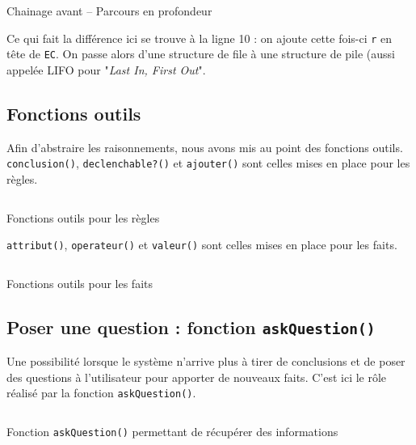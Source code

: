 \documentclass[a4paper,12pt]{article}
\begin{document}
\begin{listing}[H]
	\centering
	\inputminted[breaklines=true,linenos]{lisp}{../chainageAvantProf.lisp}
	\caption{Chainage avant -- Parcours en profondeur}
\end{listing}


Ce qui fait la différence ici se trouve à la ligne 10 : on ajoute cette fois-ci \texttt{r} en tête de \texttt{EC}. On passe alors d'une structure de file à une structure de pile (aussi appelée LIFO pour "\textit{Last In, First Out}".

\subsection{Fonctions outils}

Afin d'abstraire les raisonnements, nous avons mis au point des fonctions outils. \texttt{conclusion()}, \texttt{declenchable?()} et \texttt{ajouter()} sont celles mises en place pour les règles.
\begin{listing}[H]
	\centering
	\inputminted[breaklines=true,linenos]{lisp}{../fonctionsOutilsRegles.lisp}
	\caption{Fonctions outils pour les règles}
\end{listing}

\texttt{attribut()}, \texttt{operateur()} et \texttt{valeur()} sont celles mises en place pour les faits.

\begin{listing}[H]
	\centering
	\inputminted[breaklines=true,linenos]{lisp}{../fonctionsOutilsFaits.lisp}
	\caption{Fonctions outils pour les faits}
\end{listing}

\newpage
\subsection{Poser une question : fonction \texttt{askQuestion()}}

Une possibilité lorsque le système n'arrive plus à tirer de conclusions et de poser des questions à l'utilisateur pour apporter de nouveaux faits. C'est ici le rôle réalisé par la fonction \texttt{askQuestion()}.

\begin{listing}[H]
	\centering
	\inputminted[breaklines=true,linenos, lastline = 21]{lisp}{../askQuestion.lisp}
	\caption{Fonction \texttt{askQuestion()} permettant de récupérer des informations}
\end{listing}
\end{document}
